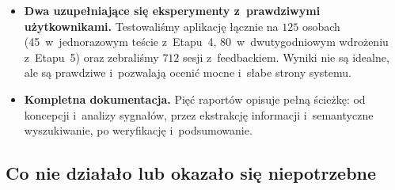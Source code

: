 \documentclass[14pt,a4paper]{extarticle}
\begin{document}
\begin{itemize}
    \item \textbf{Dwa uzupełniające się eksperymenty z~prawdziwymi użytkownikami.} Testowaliśmy aplikację łącznie na $125$ osobach (45~w~jednorazowym teście z~Etapu~4, 80~w~dwutygodniowym wdrożeniu z~Etapu~5) oraz zebraliśmy $712$ sesji z~feedbackiem. Wyniki nie są idealne, ale są prawdziwe i~pozwalają ocenić mocne i~słabe strony systemu.

    \item \textbf{Kompletna dokumentacja.} Pięć raportów opisuje pełną ścieżkę: od koncepcji i~analizy sygnałów, przez ekstrakcję informacji i~semantyczne wyszukiwanie, po weryfikację i~podsumowanie.
\end{itemize}

\subsection{Co nie działało lub okazało się niepotrzebne}
\end{document}
